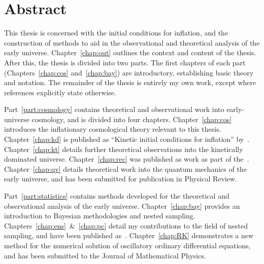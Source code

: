 \chapter*{Abstract}
\label{chap:abstract}

This thesis is concerned with the initial conditions for inflation, and the construction of methods to aid in the observational and theoretical analysis of the early universe.
Chapter~\ref{chap:out} outlines the context and content of the thesis. After this, the thesis is divided into two parts.
The first chapters of each part (Chapters~\ref{chap:cos} and~\ref{chap:bay}) are introductory, establishing basic theory and notation. The remainder of the thesis is entirely my own work, except where references explicitly state otherwise.

Part~\ref{part:cosmology} contains theoretical and observational work into early-universe cosmology, and is divided into four chapters. Chapter~\ref{chap:cos} introduces the inflationary cosmological theory relevant to this thesis. Chapter~\ref{chap:kd} is published as ``Kinetic initial conditions for inflation'' by~\cite{Handley+2014}. Chapter~\ref{chap:kt} details further theoretical observations into the kinetically dominated universe. Chapter~\ref{chap:rec} was published as work as part of the~\cite{planck2015-a24}. Chapter~\ref{chap:qv} details theoretical work into the quantum mechanics of the early universe, and has been submitted for publication in Physical Review.

Part~\ref{part:statistics} contains methods developed for the theoretical and observational analysis of the early universe. Chapter~\ref{chap:bay} provides an introduction to Bayesian methodologies and nested sampling.
Chapters~\ref{chap:ens}~\&~\ref{chap:pc} detail my contributions to the field of nested sampling, and have been published as~\cite{polychordletter,polychordpaper}.
Chapter~\ref{chap:RK} demonstrates a new method for the numerical solution of oscillatory ordinary differential equations, and has been submitted to the Journal of Mathematical Physics.


\cleardoublepage{}
